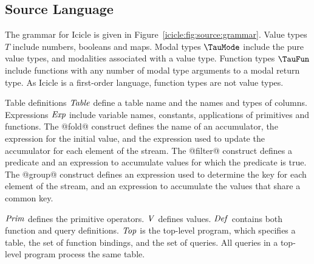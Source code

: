 \subsection{Source Language}
\label{icicle:s:IcicleSource}





The grammar for Icicle is given in Figure~\ref{icicle:fig:source:grammar}.
Value types $T$ include numbers, booleans and maps.
Modal types $\TauMode$ include the pure value types, and modalities associated with a value type.
Function types $\TauFun$ include functions with any number of modal type arguments to a modal return type.
As Icicle is a first-order language, function types are not value types.

Table definitions $\mathit{Table}$ define a table name and the names and types of columns.
Expressions $\mathit{Exp}$ include variable names, constants, applications of primitives and functions.
The @fold@ construct defines the name of an accumulator, the expression for the initial value, and the expression used to update the accumulator for each element of the stream.
The @filter@ construct defines a predicate and an expression to accumulate values for which the predicate is true.
The @group@ construct defines an expression used to determine the key for each element of the stream, and an expression to accumulate the values that share a common key.

$\mathit{Prim}$ defines the primitive operators.
$\mathit{V}$ defines values.
$\mathit{Def}$ contains both function and query definitions.
$\mathit{Top}$ is the top-level program, which specifies a table, the set of function bindings, and the set of queries.
All queries in a top-level program process the same table.


